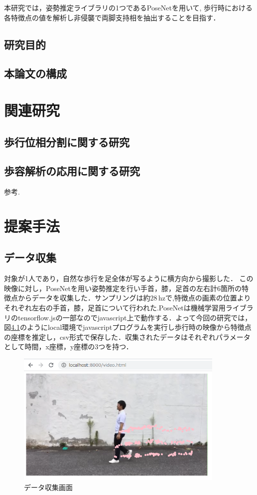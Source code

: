 \documentclass[a4j,10.5pt]{jreport}
\begin{document}
本研究では，姿勢推定ライブラリの1つであるPoseNetを用いて,
歩行時における各特徴点の値を解析し非侵襲で両脚支持相を抽出することを目指す．
\section{研究目的}

\section{本論文の構成}

\chapter{関連研究}
\section{歩行位相分割に関する研究}
\section{歩容解析の応用に関する研究}

参考\cite{cite1}.

\chapter{提案手法}
\section{データ収集}
対象が1人であり，自然な歩行を足全体が写るように横方向から撮影した．
この映像に対し，PoseNetを用い姿勢推定を行い手首，膝，足首の左右計6箇所の特徴点からデータを収集した．サンプリングは約$28\,\mathrm{hz}$で,特徴点の画素の位置よりそれぞれ左右の手首，膝，足首について行われた.PoseNetは機械学習用ライブラリのtensorflow.jsの一部なのでjavascript上で動作する．よって今回の研究では，図\ref{fig:datecollect}のようにlocal環境でjavascriptプログラムを実行し歩行時の映像から特徴点の座標を推定し，csv形式で保存した．収集されたデータはそれぞれパラメータとして時間，x座標，y座標の3つを持つ．
\begin{figure}[H]
  \centering
  \includegraphics[width=10cm]{figs/datacollect1.png}
  \caption{データ収集画面}\label{fig:datecollect}
\end{figure}
\end{document}
